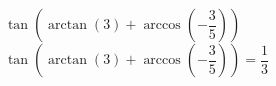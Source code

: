  {$\tan\left( \arctan(3) + \arccos\left(-\dfrac{3}{5}\right) \right)$}
{ $\tan\left( \arctan(3) + \arccos\left(-\dfrac{3}{5}\right) \right) = \dfrac{1}{3}$}
